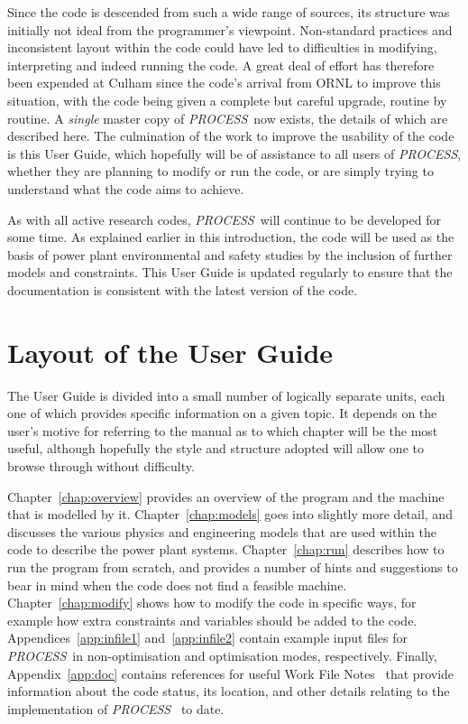 \documentclass[11pt,a4paper]{report}
\newcommand{\PS}{\mbox{\it PROCESS\/ }}
\newcommand{\PSC}{\mbox{\it PROCESS},\/ }
\begin{document}
Since the code is descended from such a wide range of sources, its structure
was initially not ideal from the programmer's viewpoint.  Non-standard
practices and inconsistent layout within the code could have led to
difficulties in modifying, interpreting and indeed running the code. A great
deal of effort has therefore been expended at Culham since the code's arrival
from ORNL to improve this situation, with the code being given a complete but
careful upgrade, routine by routine. A {\em single}\/ master copy of \PS now
exists, the details of which are described here. The culmination of the work
to improve the usability of the code is this User Guide, which hopefully will
be of assistance to all users of \PSC whether they are planning to modify or
run the code, or are simply trying to understand what the code aims to
achieve.

As with all active research codes, \PS will continue to be developed for some
time. As explained earlier in this introduction, the code will be used as the
basis of power plant environmental and safety studies by the inclusion of
further models and constraints. This User Guide is updated regularly to ensure
that the documentation is consistent with the latest version of the code.

\section{Layout of the User Guide}

The User Guide is divided into a small number of logically separate units,
each one of which provides specific information on a given topic. It depends
on the user's motive for referring to the manual as to which chapter will be
the most useful, although hopefully the style and structure adopted will allow
one to browse through without difficulty.

Chapter~\ref{chap:overview} provides an overview of the program and the
machine that is modelled by it. Chapter~\ref{chap:models} goes into slightly
more detail, and discusses the various physics and engineering models that are
used within the code to describe the power plant systems.
Chapter~\ref{chap:run} describes how to run the program from scratch, and
provides a number of hints and suggestions to bear in mind when the code does
not find a feasible machine. Chapter~\ref{chap:modify} shows how to modify the
code in specific ways, for example how extra constraints and variables should
be added to the code. Appendices~\ref{app:infile1} and~\ref{app:infile2}
contain example input files for \PS in non-optimisation and optimisation
modes, respectively. Finally, Appendix~\ref{app:doc} contains references for
useful Work File Notes~\cite{PWF} that provide information about the code
status, its location, and other details relating to the implementation of \PS
to date.
\end{document}

